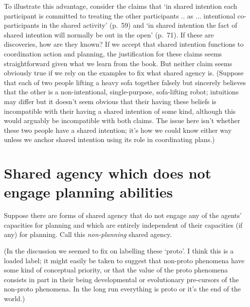\documentclass[12pt,letterpaper]{extarticle}
\begin{document}
To illustrate this advantage, consider the claims that `in shared intention each participant is committed to treating the other participants .. as ... intentional co-participants in the shared activity' (p.\ 59) and `in shared intention the fact of shared intention will normally be out in the open' (p.\ 71).
If these are discoveries, how are they known?  
If we accept that  shared intention functions to coordination action and planning, the justification for these claims seems straightforward given what we learn from the book.
But neither claim seems obviously true if we rely on the examples to fix what shared agency is.
(Suppose that each of two people lifting a heavy sofa together falsely but sincerely believes that the other is a non-intentional, single-purpose, sofa-lifting robot; intuitions may differ but it doesn't seem obvious that their having these beliefs is incompatible with their having a shared intention of some kind, although this would arguably be incompatible with both claims.
The issue here isn't whether these two people have a shared intention; it's how we could know either way unless we anchor shared intention using its role in coordinating plans.)


\section{Shared agency which does not engage planning abilities}
\label{nonplanning}

Suppose there are forms of shared agency that do not engage any of the agents' capacities for planning and which are entirely independent of their capacities (if any) for planning.  
Call this \emph{non-planning} shared agency.

(In the discussion we seemed to fix on labelling these `proto'.
I think this is a loaded label; it might easily be taken to suggest that non-proto phenomena have some kind of conceptual priority, or that the value of the proto phenomena consists in part in their being developmental or evolutionary pre-cursors of the non-proto phenomena.
In the long run everything is proto or it's the end of the world.)
\end{document}
